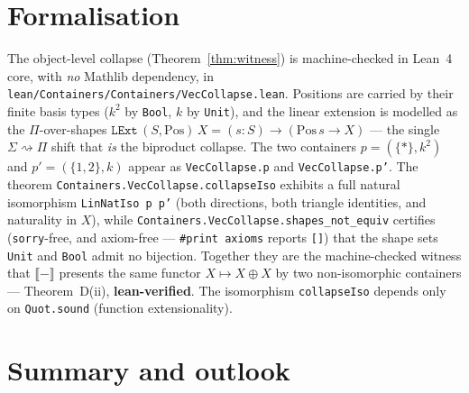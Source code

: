 \documentclass[11pt]{article}
\theoremstyle{plain}
\theoremstyle{definition}
\theoremstyle{remark}
\newcommand{\ext}[1]{\llbracket #1 \rrbracket}
\begin{document}
\section{Formalisation}
\label{sec:lean}

The object-level collapse (Theorem~\ref{thm:witness}) is machine-checked in Lean~4 core, with
\emph{no} Mathlib dependency, in \texttt{lean/Containers/Containers/VecCollapse.lean}. Positions are
carried by their finite basis types ($k^2$ by \texttt{Bool}, $k$ by \texttt{Unit}), and the linear
extension is modelled as the $\Pi$-over-shapes
$\mathtt{LExt}\,(S,\mathrm{Pos})\,X=(s:S)\to(\mathrm{Pos}\,s\to X)$ --- the single
$\Sigma\!\rightsquigarrow\!\Pi$ shift that \emph{is} the biproduct collapse. The two containers
$p=(\{\ast\},k^2)$ and $p'=(\{1,2\},k)$ appear as \texttt{VecCollapse.p} and \texttt{VecCollapse.p'}.
The theorem \texttt{Containers.VecCollapse.collapseIso} exhibits a full natural isomorphism
\texttt{LinNatIso p p'} (both directions, both triangle identities, and naturality in $X$), while
\texttt{Containers.VecCollapse.shapes\_not\_equiv} certifies (\texttt{sorry}-free, and axiom-free ---
\texttt{\#print axioms} reports \texttt{[]}) that the shape sets \texttt{Unit} and \texttt{Bool}
admit no bijection. Together they are the machine-checked witness that $\ext{-}$ presents the same
functor $X\mapsto X\oplus X$ by two non-isomorphic containers --- Theorem~D(ii), \textbf{lean-verified}.
The isomorphism \texttt{collapseIso} depends only on \texttt{Quot.sound} (function extensionality).

\section{Summary and outlook}
\label{sec:summary}
\end{document}
